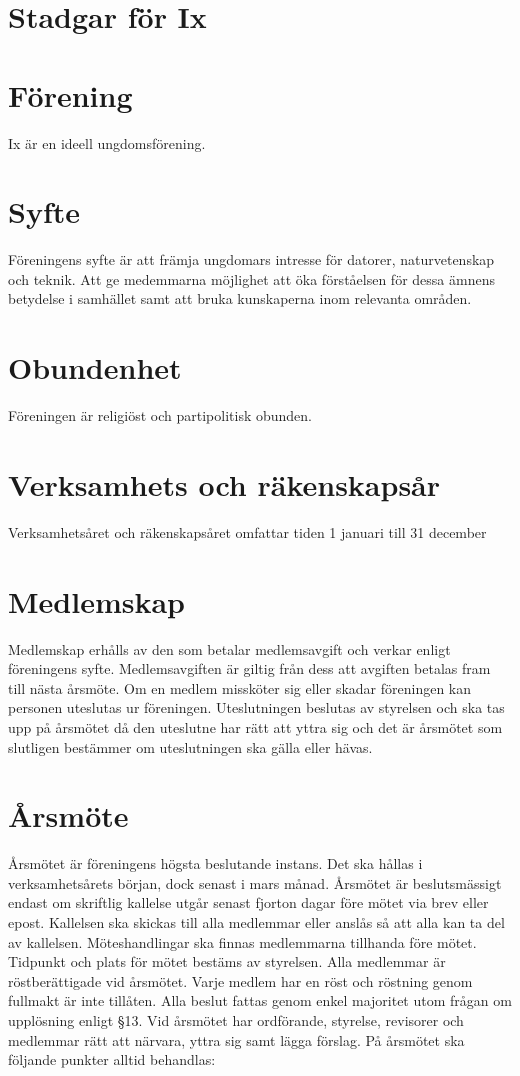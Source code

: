 \documentclass[a4paper,11pt,oneside]{article}
\begin{document}
\section*{Stadgar för Ix}

\section{Förening}
Ix är en ideell ungdomsförening.

\section{Syfte}
Föreningens syfte är att främja ungdomars intresse för datorer, naturvetenskap
och teknik. Att ge medemmarna möjlighet att öka förståelsen för dessa ämnens
betydelse i samhället samt att bruka kunskaperna inom relevanta områden.

\section{Obundenhet}
Föreningen är religiöst och partipolitisk obunden.

\section{Verksamhets­ och räkenskapsår}
Verksamhetsåret och räkenskapsåret omfattar tiden 1 januari till 31 december

\section{Medlemskap}
Medlemskap erhålls av den som betalar medlemsavgift och verkar enligt
föreningens syfte. Medlemsavgiften är giltig från dess att avgiften betalas fram
till nästa årsmöte. Om en medlem missköter sig eller skadar föreningen kan
personen uteslutas ur föreningen. Uteslutningen beslutas av styrelsen och ska
tas upp på årsmötet då den uteslutne har rätt att yttra sig och det är årsmötet
som slutligen bestämmer om uteslutningen ska gälla eller hävas.

\section{Årsmöte}
Årsmötet är föreningens högsta beslutande instans. Det ska hållas i
verksamhetsårets början, dock senast i mars månad. Årsmötet är beslutsmässigt
endast om skriftlig kallelse utgår senast fjorton dagar före mötet via brev
eller epost. Kallelsen ska skickas till alla medlemmar eller anslås så att alla
kan ta del av kallelsen. Möteshandlingar ska finnas medlemmarna tillhanda före
mötet. Tidpunkt och plats för mötet bestäms av styrelsen. Alla medlemmar är
röstberättigade vid årsmötet. Varje medlem har en röst och röstning genom
fullmakt är inte tillåten. Alla beslut fattas genom enkel majoritet utom frågan
om upplösning enligt §13. Vid årsmötet har ordförande, styrelse, revisorer och
medlemmar rätt att närvara, yttra sig samt lägga förslag. På årsmötet ska
följande punkter alltid behandlas:
\end{document}
